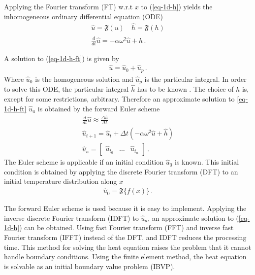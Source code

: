 Applying the Fourier transform (FT) w.r.t \(x\) to (\ref{eq-1d-h}) yields the inhomogeneous ordinary differential equation (ODE)
\begin{gather}
\hat{u} = \mathfrak{F}(u) \quad \hat{h} = \mathfrak{F}(h) \\
\frac{d}{dt} \hat{u} = -\alpha\omega^{2}\hat{u} + \hat{h}\,. \label{eq-1d-h-ft}
\end{gather}

A solution to (\ref{eq-1d-h-ft}) is given by
\begin{gather}
\hat{u} = \hat{u}_{0} + \hat{u}_{p}\,.
\end{gather}
Where \(\hat{u}_{0}\) is the homogeneous solution and \(\hat{u}_{p}\) is the particular integral.
In order to solve this ODE, the particular integral \(\hat{h}\) has to be known \cite{Papula2015}.
The choice of \(h\) is, except for some restrictions, arbitrary.
Therefore an approximate solution to \ref{eq-1d-h-ft} \(\hat{u}_{a}\) is obtained by the forward Euler scheme
\begin{gather}
\frac{d}{dt} \hat{u} \approx \frac{\Delta \hat{u}}{\Delta t} \\
\hat{u}_{t+1} = \hat{u}_{t} + \Delta t (-\alpha\omega^{2}\hat{u} + \hat{h}) \label{eq-1d-h-es} \\
\hat{u}_{a} = \begin{bmatrix}
\hat{u}_{t_{0}} & \hdots & \hat{u}_{t_{n}}
\end{bmatrix}\,.
\end{gather}
The Euler scheme is applicable if an initial condition \(\hat{u}_{0}\) is known. 
This initial condition is obtained by applying the discrete Fourier transform (DFT) to an initial temperature distribution along \(x\)
\begin{gather}
\hat{u}_{0} = \mathfrak{F} \{f(x)\}\,.
\end{gather} 
\cite{Gustafsson2011b}

The forward Euler scheme is used because it is easy to implement.
Applying the inverse discrete Fourier transform (IDFT) to \(\hat{u}_{a}\), an approximate solution to (\ref{eq-1d-h}) can be obtained.
Using fast Fourier transform (FFT) and inverse fast Fourier transform (IFFT)  instead of the DFT, and IDFT reduces the processing time.
This method for solving the heat equation raises the problem that it cannot handle boundary conditions. 
Using the finite element method, the heat equation is solvable as an initial boundary value problem (IBVP).
